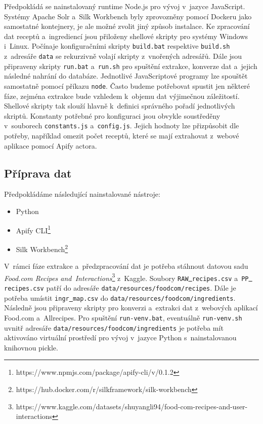\documentclass[12pt,a4paper]{report}
\begin{document}
Předpokládá se nainstalovaný runtime Node.js pro vývoj v~jazyce JavaScript. Systémy Apache Solr a~Silk Workbench byly zprovozněny pomocí Dockeru jako samostatné kontejnery, je ale možné zvolit jiný způsob instalace. Ke zpracování dat receptů a~ingrediencí jsou přiloženy shellové skripty pro systémy Windows i~Linux. Počínaje konfiguračními skripty \texttt{build.bat} respektive \texttt{build.sh} z~adresáře \texttt{data} se rekurzivně volají skripty z~vnořených adresářů. Dále jsou připraveny skripty \texttt{run.bat} a~\texttt{run.sh} pro spuštění extrakce, konverze dat a~jejich následné nahrání do databáze. Jednotlivé JavaScriptové programy lze spouštět samostatně pomocí příkazu \texttt{node}. Často budeme potřebovat spustit jen některé fáze, zejména extrakce bude vzhledem k~objemu dat výjimečnou záležitostí. Shellové skripty tak slouží hlavně k~definici správného pořadí jednotlivých skriptů. Konstanty potřebné pro konfiguraci jsou obvykle soustředěny v~souborech \texttt{constants.js} a~\texttt{config.js}. Jejich hodnoty lze přizpůsobit dle potřeby, například omezit počet receptů, které se mají extrahovat z~webové aplikace pomocí Apify actora.

\subsection{Příprava dat}

Předpokládáme následující nainstalované nástroje:

\begin{itemize}
    \item Python
    \item Apify CLI\footnote{https://www.npmjs.com/package/apify-cli/v/0.1.2}
    \item Silk Workbench\footnote{https://hub.docker.com/r/silkframework/silk-workbench}
\end{itemize}

V~rámci fáze extrakce a~předzpracování dat je potřeba stáhnout datovou sadu \emph{Food.com Recipes and~Interactions}\footnote{https://www.kaggle.com/datasets/shuyangli94/food-com-recipes-and-user-interactions} z~Kaggle. Soubory \texttt{RAW\underline{{ }}recipes.csv} a~\texttt{PP\underline{{ }}recipes.csv} patří do adresáře \texttt{data/resources/foodcom/recipes}. Dále je potřeba umístit \texttt{ingr\underline{{ }}map.csv} do \texttt{data/resources/foodcom/ingredients}. Následně jsou připraveny skripty pro konverzi a~extrakci dat z~webových aplikací Food.com a~Allrecipes. Pro spuštění \texttt{run-venv.bat}, eventuálně \texttt{run-venv.sh} uvnitř adresáře \texttt{data/resources/foodcom/ingredients} je potřeba mít aktivováno virtuální prostředí pro vývoj v~jazyce Python s~nainstalovanou knihovnou pickle.
\end{document}
